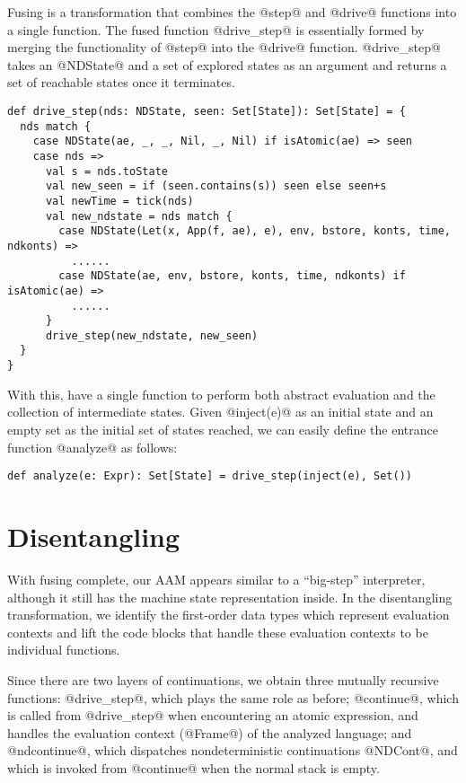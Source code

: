 \documentclass[acmsmall,review,anonymous]{acmart}\settopmatter{printfolios=true,printccs=false,printacmref=false}
\begin{document}
Fusing is a transformation that combines the @step@ and @drive@ functions into a single
function.
The fused function @drive_step@ is essentially formed by merging the functionality of
@step@ into the @drive@ function.
@drive_step@ takes an @NDState@ and a set of explored states as an argument
and returns a set of reachable states once it terminates. 

\begin{lstlisting}
def drive_step(nds: NDState, seen: Set[State]): Set[State] = {
  nds match {
    case NDState(ae, _, _, Nil, _, Nil) if isAtomic(ae) => seen
    case nds =>
      val s = nds.toState
      val new_seen = if (seen.contains(s)) seen else seen+s
      val newTime = tick(nds)
      val new_ndstate = nds match {
        case NDState(Let(x, App(f, ae), e), env, bstore, konts, time, ndkonts) =>
          ......
        case NDState(ae, env, bstore, konts, time, ndkonts) if isAtomic(ae) =>
          ......
      }
      drive_step(new_ndstate, new_seen)
  }
}
\end{lstlisting}

With this, have a single function to perform both abstract evaluation and the collection of
intermediate states. Given @inject(e)@ as an initial state and an empty set as the
initial set of states reached, we can easily define the entrance function @analyze@ as
follows:

\begin{lstlisting}
def analyze(e: Expr): Set[State] = drive_step(inject(e), Set())
\end{lstlisting}

\section{Disentangling} \label{disen}

With fusing complete, our AAM
appears similar to a ``big-step'' interpreter, although it still has the machine
state representation inside.
In the disentangling transformation, we
identify the first-order data types which represent evaluation contexts
and lift the code blocks that handle these evaluation contexts to be individual functions.

Since there are two layers of continuations,
we obtain three mutually recursive functions: @drive_step@, which plays the same
role as before; @continue@, which is called from @drive_step@ when encountering an atomic expression, and handles the evaluation context (@Frame@) of the analyzed
language; and @ndcontinue@, which dispatches nondeterministic continuations @NDCont@,
and which is invoked from @continue@ when the normal stack is empty.
\end{document}
